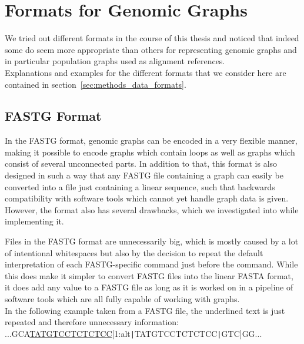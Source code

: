 \documentclass[a4paper,12pt,twoside,BCOR=10mm]{scrbook}
\def\pipe{\texttt{|}}
\begin{document}
\section{Formats for Genomic Graphs}
\label{sec:results_data_formats}
%

We tried out different formats in the course of this thesis
and noticed that indeed some do seem more appropriate than others
for representing genomic graphs
and in particular population graphs used as alignment references. \\
Explanations and examples for the different formats that we consider here
are contained in section~\ref{sec:methods_data_formats}.

\subsection{FASTG Format}

In the FASTG format, genomic graphs can be encoded in a very flexible manner,
making it possible to encode graphs which contain loops as well as graphs
which consist of several unconnected parts.
In addition to that, this format is also designed in such a way that any
FASTG file containing a graph can easily be converted into a file just containing
a linear sequence, such that backwards compatibility with software tools which
cannot yet handle graph data is given. \\
However, the format also has several drawbacks, which we investigated into
while implementing it.

Files in the FASTG format are unnecessarily big, which is mostly caused
by a lot of intentional whitespaces but also by the decision to repeat the
default interpretation of each FASTG-specific command just before the command.
While this does make it simpler to convert FASTG files into the linear FASTA format,
it does add any value to a FASTG file as long as it is worked on in a pipeline of
software tools which are all fully capable of working with graphs. \\
In the following example taken from a FASTG file, the underlined
text is just repeated and therefore unnecessary information: \\
...GCA\underline{TATGTCCTCTCTCC}[1:alt\pipe TATGTCCTCTCTCC\pipe GTC]GG...
\end{document}
